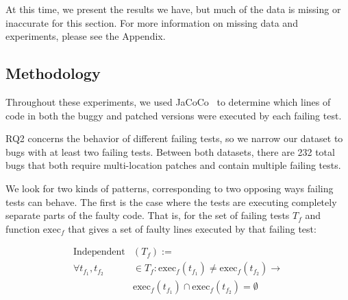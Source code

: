 \documentclass[10pt,journal,compsoc]{IEEEtran}
\begin{document}




At this time, we present the results we have, but much of the data is missing or inaccurate for this section. 
For more information on missing data and experiments, please see the Appendix.



\subsection{Methodology}

Throughout these experiments, we used JaCoCo~\cite{jacoco}
to determine which lines of code in both the buggy and patched versions were executed
by each failing test.

RQ2 concerns the behavior of different failing tests, so we narrow our dataset to bugs
with at least two failing tests. 
Between both datasets, there are 232 total bugs that both require multi-location
patches and contain multiple failing tests. 

We look for two kinds of patterns, corresponding to two opposing ways failing tests can behave.
The first is the case where the tests are executing completely 
separate parts of the faulty code. That is, for the set of failing tests $T_f$ and function $\text{exec}_f$ 
that gives a set of faulty lines executed by that failing test: 

\begin{equation}
\begin{aligned}
    \text{Independent}&(T_f) := \\
    \forall{t_{f_1}, t_{f_2}} &\in T_f : \text{exec}_f(t_{f_1}) \ne \text{exec}_f(t_{f_2}) \longrightarrow \\
    &\text{exec}_f(t_{f_1}) \cap\text{exec}_f(t_{f_2}) = \emptyset 
\end{aligned}
\end{equation}
\end{document}

